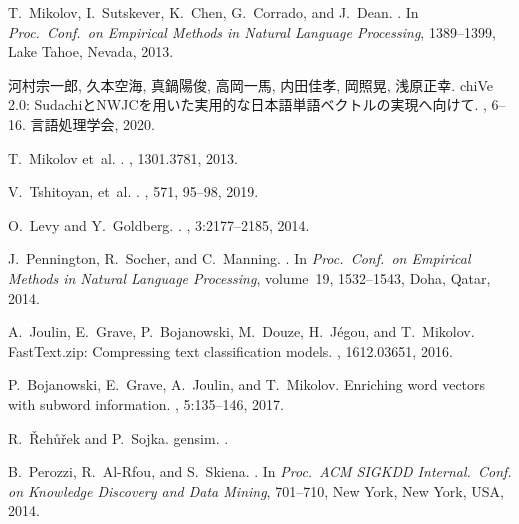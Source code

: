 \documentclass[J]{scitrans}
\begin{document}
%
%
\begin{thebibliography}{10}

T.~Mikolov, I.~Sutskever, K.~Chen, G.~Corrado, and J.~Dean.
.
\newblock In {\em Proc.~Conf.~on Empirical Methods in Natural Language Processing}, 1389--1399, Lake Tahoe, Nevada, 2013.

河村宗一郎, 久本空海, 真鍋陽俊, 高岡一馬, 内田佳孝, 岡照晃, 浅原正幸.
\newblock chiVe 2.0: SudachiとNWJCを用いた実用的な日本語単語ベクトルの実現へ向けて.
, 6--16. 言語処理学会, 2020.

T.~Mikolov et~al.
.
        , 1301.3781, 2013.

V.~Tshitoyan, et~al.
.
, 571, 95--98, 2019.

O.~Levy and Y.~Goldberg. .
,
  3:2177--2185, 2014.

J.~Pennington, R.~Socher, and C.~Manning.
.
\newblock In {\em Proc.~Conf.~on Empirical Methods in
  Natural Language Processing}, volume~19, 1532--1543,
  Doha, Qatar, 2014.

A.~Joulin, E.~Grave, P.~Bojanowski, M.~Douze, H.~J{\'e}gou, and T.~Mikolov.
\newblock FastText.zip: Compressing text classification models.
, 1612.03651, 2016.

P.~Bojanowski, E.~Grave, A.~Joulin, and T.~Mikolov.
\newblock Enriching word vectors with subword information.
, 5:135--146, 2017.

R.~{\v R}eh{\r u}{\v r}ek and P.~Sojka.
\newblock gensim.
.

B.~Perozzi, R.~Al-Rfou, and S.~Skiena.
.
\newblock In {\em Proc.~ACM SIGKDD Internal.~Conf. on Knowledge Discovery and Data Mining}, 701--710, New York, New York, USA, 2014.


\end{thebibliography}
\end{document}
